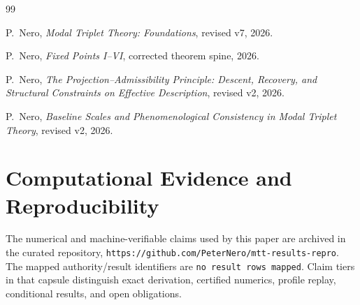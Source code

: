 \documentclass[11pt]{article}
\begin{document}
\begin{thebibliography}{99}

P.~Nero,
\newblock \emph{Modal Triplet Theory: Foundations}, revised v7, 2026.

P.~Nero,
\newblock \emph{Fixed Points I--VI}, corrected theorem spine, 2026.

P.~Nero,
\newblock \emph{The Projection--Admissibility Principle: Descent, Recovery,
and Structural Constraints on Effective Description}, revised v2, 2026.

P.~Nero,
\newblock \emph{Baseline Scales and Phenomenological Consistency in Modal
Triplet Theory}, revised v2, 2026.

\end{thebibliography}

\section*{Computational Evidence and Reproducibility}
The numerical and machine-verifiable claims used by this paper are archived in the curated repository, \texttt{https://github.com/PeterNero/mtt-results-repro}. The mapped authority/result identifiers are \texttt{no result rows mapped}. Claim tiers in that capsule distinguish exact derivation, certified numerics, profile replay, conditional results, and open obligations.
\end{document}
